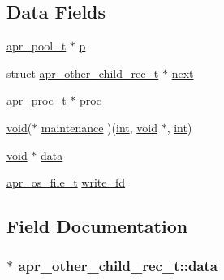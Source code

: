 \subsection*{Data Fields}
\begin{DoxyCompactItemize}
\item 
\hyperlink{structapr__pool__t}{apr\+\_\+pool\+\_\+t} $\ast$ \hyperlink{structapr__other__child__rec__t_a9673858fcba658ce915f117f5074ae5b}{p}
\item 
struct \hyperlink{structapr__other__child__rec__t}{apr\+\_\+other\+\_\+child\+\_\+rec\+\_\+t} $\ast$ \hyperlink{structapr__other__child__rec__t_aea03c4592b125802cea8dedb112fe813}{next}
\item 
\hyperlink{structapr__proc__t}{apr\+\_\+proc\+\_\+t} $\ast$ \hyperlink{structapr__other__child__rec__t_ad92d3343ce25898c8246e1d88dba9d8d}{proc}
\item 
\hyperlink{group__MOD__ISAPI_gacd6cdbf73df3d9eed42fa493d9b621a6}{void}($\ast$ \hyperlink{structapr__other__child__rec__t_a6084c939d2dd9b31548775260b209be4}{maintenance} )(\hyperlink{pcre_8txt_a42dfa4ff673c82d8efe7144098fbc198}{int}, \hyperlink{group__MOD__ISAPI_gacd6cdbf73df3d9eed42fa493d9b621a6}{void} $\ast$, \hyperlink{pcre_8txt_a42dfa4ff673c82d8efe7144098fbc198}{int})
\item 
\hyperlink{group__MOD__ISAPI_gacd6cdbf73df3d9eed42fa493d9b621a6}{void} $\ast$ \hyperlink{structapr__other__child__rec__t_a3d3fcefe86e50a24c211db82c9a9275e}{data}
\item 
\hyperlink{group__apr__portabile_ga885491b889a4a719549650d3a370fd34}{apr\+\_\+os\+\_\+file\+\_\+t} \hyperlink{structapr__other__child__rec__t_ae73e10a3613921ac266baf2e9278fa37}{write\+\_\+fd}
\end{DoxyCompactItemize}


\subsection{Field Documentation}
\subsubsection[{\texorpdfstring{data}{data}}]{ $\ast$ apr\+\_\+other\+\_\+child\+\_\+rec\+\_\+t\+::data}\hypertarget{structapr__other__child__rec__t_a3d3fcefe86e50a24c211db82c9a9275e}{}\label{structapr__other__child__rec__t_a3d3fcefe86e50a24c211db82c9a9275e}
